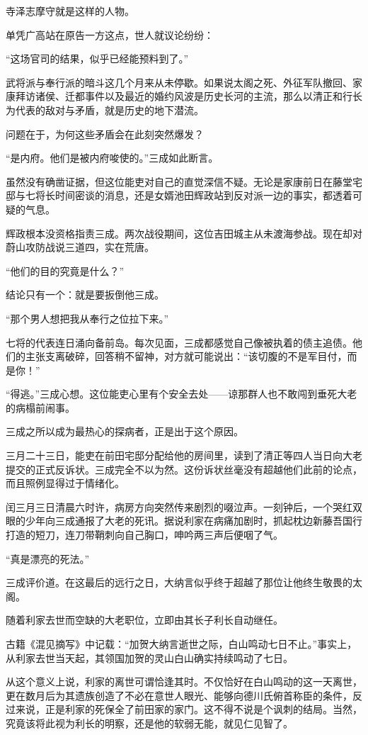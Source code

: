\documentclass[
]{book}
\begin{document}
寺泽志摩守就是这样的人物。

单凭广高站在原告一方这点，世人就议论纷纷：

``这场官司的结果，似乎已经能预料到了。''

武将派与奉行派的暗斗这几个月来从未停歇。如果说太阁之死、外征军队撤回、家康拜访诸侯、迁都事件以及最近的婚约风波是历史长河的主流，那么以清正和行长为代表的敌对与矛盾，就是历史的地下潜流。

问题在于，为何这些矛盾会在此刻突然爆发？

``是内府。他们是被内府唆使的。''三成如此断言。

虽然没有确凿证据，但这位能吏对自己的直觉深信不疑。无论是家康前日在藤堂宅邸与七将长时间密谈的消息，还是女婿池田辉政站到反对派一边的事实，都透着可疑的气息。

辉政根本没资格指责三成。两次战役期间，这位吉田城主从未渡海参战。现在却对蔚山攻防战说三道四，实在荒唐。

``他们的目的究竟是什么？''

结论只有一个：就是要扳倒他三成。

``那个男人想把我从奉行之位拉下来。''

七将的代表连日涌向备前岛。每次见面，三成都感觉自己像被执着的债主追债。他们的主张支离破碎，回答稍不留神，对方就可能说出：``该切腹的不是军目付，而是你！''

``得逃。''三成心想。这位能吏心里有个安全去处------谅那群人也不敢闯到垂死大老的病榻前闹事。

三成之所以成为最热心的探病者，正是出于这个原因。

三月二十三日，能吏在前田宅邸分配给他的房间里，读到了清正等四人当日向大老提交的正式反诉状。三成完全不以为然。这份诉状丝毫没有超越他们此前的论点，而且照例显得过于情绪化。

闰三月三日清晨六时许，病房方向突然传来剧烈的啜泣声。一刻钟后，一个哭红双眼的少年向三成通报了大老的死讯。据说利家在病痛加剧时，抓起枕边新藤吾国行打造的短刀，连刀带鞘刺向自己胸口，呻吟两三声后便咽了气。

``真是漂亮的死法。''

三成评价道。在这最后的远行之日，大纳言似乎终于超越了那位让他终生敬畏的太阁。

随着利家去世而空缺的大老职位，立即由其长子利长自动继任。

古籍《混见摘写》中记载：``加贺大纳言逝世之际，白山鸣动七日不止。''事实上，从利家去世当天起，其领国加贺的灵山白山确实持续鸣动了七日。

从这个意义上说，利家的离世可谓恰逢其时。不仅恰好在白山鸣动的这一天离世，更在数月后为其遗族创造了不必在意世人眼光、能够向德川氏俯首称臣的条件，反过来说，正是利家的死保全了前田家的家门。这不得不说是个讽刺的结局。当然，究竟该将此视为利长的明察，还是他的软弱无能，就见仁见智了。
\end{document}

